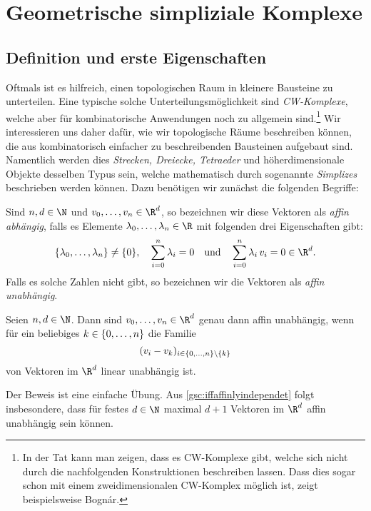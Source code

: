 \chapter{Geometrische simpliziale Komplexe}
\section{Definition und erste Eigenschaften} %
Oftmals ist es hilfreich, einen topologischen Raum in kleinere Bausteine zu
unterteilen. Eine typische solche Unterteilungsmöglichkeit sind \emph{CW-Komplexe}, welche
aber für kombinatorische Anwendungen noch zu allgemein sind.\footnote{%
    In der Tat kann man zeigen, dass es CW-Komplexe gibt, welche sich nicht
    durch die nachfolgenden Konstruktionen beschreiben lassen. Dass dies sogar
    schon mit einem zweidimensionalen CW-Komplex möglich ist, zeigt
    beispielsweise Bognár\cite{artcle:bognar77}.%
}
Wir interessieren uns daher dafür, wie wir topologische Räume beschreiben
können, die aus kombinatorisch einfacher zu beschreibenden Bausteinen aufgebaut
sind. Namentlich werden dies \emph{Strecken, Dreiecke, Tetraeder} und
höherdimensionale Objekte desselben Typus sein, welche mathematisch durch
sogenannte \emph{Simplizes} beschrieben werden können. Dazu benötigen wir
zunächst die folgenden Begriffe:

\begin{thDef}
    Sind $n,d\in\N$ und $v_0,\ldots,v_n\in\R^d$, so bezeichnen wir diese
    Vektoren als \emph{affin abhängig}, falls es Elemente
    $\lambda_0,\ldots,\lambda_n \in\R$ mit folgenden drei Eigenschaften gibt:
    \[ \{\lambda_0,\ldots,\lambda_n\} \neq \{0\}, \quad \isum^n \lambda_i = 0
    \qundq \isum^n \lambda_i\,v_i = 0 \in\R^d.\] 
    Falls es solche Zahlen nicht gibt, so bezeichnen wir die Vektoren als
    \emph{affin unabhängig}.
\end{thDef}

\begin{thLemma}
    \label{gsc:iffaffinlyindependet}
    Seien $n,d\in\N$. Dann sind $v_0,\ldots,v_n\in\R^d$ genau dann affin
    unabhängig, wenn für ein beliebiges $k\in\{0,\ldots,n\}$ die Familie
    \[  (v_i - v_k)_{i \in\{0,\ldots,n\}\setminus\{k\}} \] 
    von Vektoren im $\R^d$ linear unabhängig ist.
\end{thLemma}

Der Beweis ist eine einfache Übung.
Aus \cref{gsc:iffaffinlyindependet} folgt insbesondere, dass für festes $d\in\N$
maximal $d+1$ Vektoren im $\R^d$ affin unabhängig sein können.

